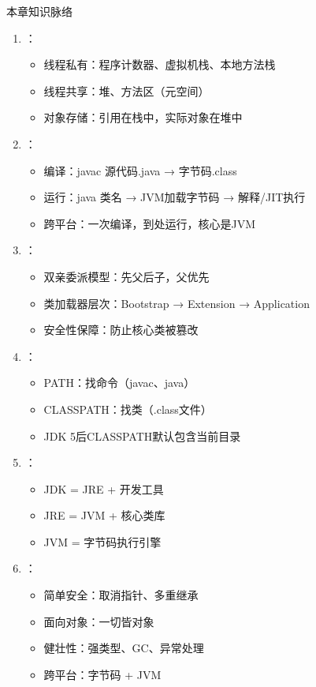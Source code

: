 \documentclass[12pt, a4paper]{ctexart}
\begin{document}
\begin{bluebox}{本章知识脉络}
	\begin{enumerate}
		\item {}：
		      \begin{itemize}
			      \item 线程私有：程序计数器、虚拟机栈、本地方法栈
			      \item 线程共享：堆、方法区（元空间）
			      \item 对象存储：引用在栈中，实际对象在堆中
		      \end{itemize}

		\item {}：
		      \begin{itemize}
			      \item 编译：javac 源代码.java → 字节码.class
			      \item 运行：java 类名 → JVM加载字节码 → 解释/JIT执行
			      \item 跨平台：一次编译，到处运行，核心是JVM
		      \end{itemize}

		\item {}：
		      \begin{itemize}
			      \item 双亲委派模型：先父后子，父优先
			      \item 类加载器层次：Bootstrap → Extension → Application
			      \item 安全性保障：防止核心类被篡改
		      \end{itemize}

		\item {}：
		      \begin{itemize}
			      \item PATH：找命令（javac、java）
			      \item CLASSPATH：找类（.class文件）
			      \item JDK 5后CLASSPATH默认包含当前目录
		      \end{itemize}

		\item {}：
		      \begin{itemize}
			      \item {JDK = JRE + 开发工具}
			      \item {JRE = JVM + 核心类库}
			      \item {JVM = 字节码执行引擎}
		      \end{itemize}

		\item {}：
		      \begin{itemize}
			      \item 简单安全：取消指针、多重继承
			      \item 面向对象：一切皆对象
			      \item 健壮性：强类型、GC、异常处理
			      \item 跨平台：字节码 + JVM
		      \end{itemize}
	\end{enumerate}
\end{bluebox}
\end{document}

